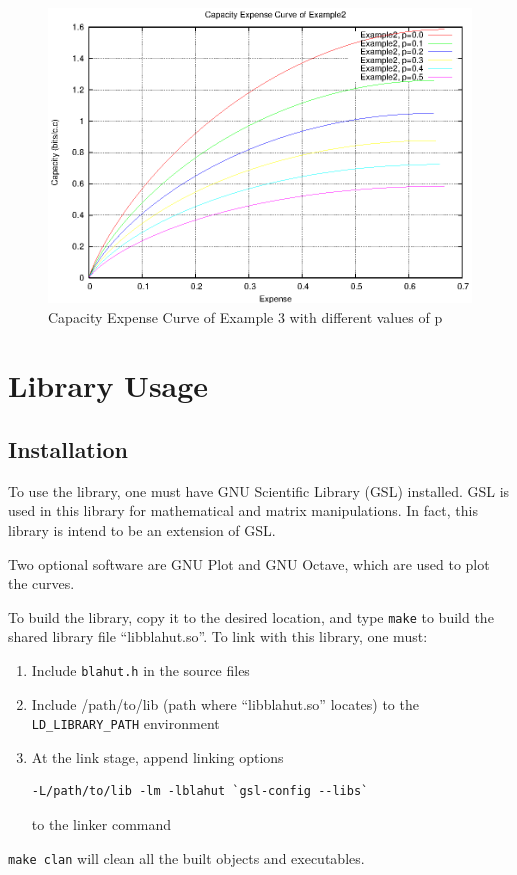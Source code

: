 \documentclass[a4paper,10pt]{article}
\begin{document}
\begin{figure}
 \centering
 \includegraphics[bb=50 50 410 302]{pic/example2_cap.eps}
 \caption{Capacity Expense Curve of Example 3 with different values of p}
 \label{fig:example2_cap}
\end{figure}

\section{Library Usage}
\label{Sec:Library_Use}
\subsection{Installation}
To use the library, one must have GNU Scientific Library (GSL) installed. GSL is used in this library for mathematical and matrix manipulations. In fact, this library is intend to be an extension of GSL. 

Two optional software are GNU Plot and GNU Octave, which are used to plot the curves.

To build the library, copy it to the desired location, and type \verb|make| to build the shared library file ``libblahut.so''. To link with this library, one must:
\begin{enumerate}
 \item Include \verb|blahut.h| in the source files
 \item Include /path/to/lib (path where ``libblahut.so'' locates) to the \verb|LD_LIBRARY_PATH| environment
 \item At the link stage, append linking options 
\begin{verbatim}
-L/path/to/lib -lm -lblahut `gsl-config --libs`
\end{verbatim}
 to the linker command
\end{enumerate}
\verb|make clan| will clean all the built objects and executables.
\end{document}

